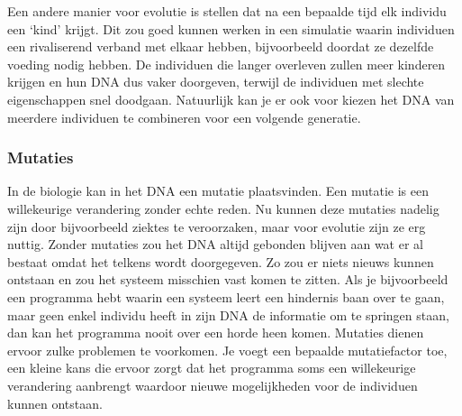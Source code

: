 Een andere manier voor evolutie is stellen dat na een bepaalde tijd elk individu een ‘kind’ krijgt. Dit zou goed kunnen werken in een simulatie waarin individuen een rivaliserend verband met elkaar hebben, bijvoorbeeld doordat ze dezelfde voeding nodig hebben. De individuen die langer overleven zullen meer kinderen krijgen en hun DNA dus vaker doorgeven, terwijl de individuen met slechte eigenschappen snel doodgaan. Natuurlijk kan je er ook voor kiezen het DNA van meerdere individuen te combineren voor een volgende generatie.

\subsubsection{Mutaties}
In de biologie kan in het DNA een mutatie plaatsvinden. Een mutatie is een willekeurige verandering zonder echte reden. Nu kunnen deze mutaties nadelig zijn door bijvoorbeeld ziektes te veroorzaken, maar voor evolutie zijn ze erg nuttig. Zonder mutaties zou het DNA altijd gebonden blijven aan wat er al bestaat omdat het telkens wordt doorgegeven. Zo zou er niets nieuws kunnen ontstaan en zou het systeem misschien vast komen te zitten. Als je bijvoorbeeld een programma hebt waarin een systeem leert een hindernis baan over te gaan, maar geen enkel individu heeft in zijn DNA de informatie om te springen staan, dan kan het programma nooit over een horde heen komen. Mutaties dienen ervoor zulke problemen te voorkomen. Je voegt een bepaalde mutatiefactor toe, een kleine kans die ervoor zorgt dat het programma soms een willekeurige verandering aanbrengt waardoor nieuwe mogelijkheden voor de individuen kunnen ontstaan.